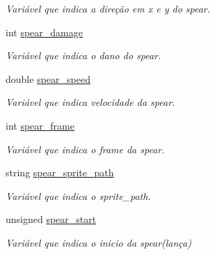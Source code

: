 \begin{DoxyCompactItemize}
\begin{DoxyCompactList}\small\item\em Variável que indica a direção em x e y do spear. \end{DoxyCompactList}\item 
\mbox{\label{classSpear_a11e9f24256eeaa389eaf8af20f70fbe8}} 
int \mbox{\hyperlink{classSpear_a11e9f24256eeaa389eaf8af20f70fbe8}{spear\+\_\+damage}}
\begin{DoxyCompactList}\small\item\em Variável que indica o dano do spear. \end{DoxyCompactList}\item 
\mbox{\label{classSpear_abe9b7dfdc8334550b3c9a77df43accc0}} 
double \mbox{\hyperlink{classSpear_abe9b7dfdc8334550b3c9a77df43accc0}{spear\+\_\+speed}}
\begin{DoxyCompactList}\small\item\em Variável que indica velocidade da spear. \end{DoxyCompactList}\item 
\mbox{\label{classSpear_a78be675fb88ce69127afc65682f7c8d5}} 
int \mbox{\hyperlink{classSpear_a78be675fb88ce69127afc65682f7c8d5}{spear\+\_\+frame}}
\begin{DoxyCompactList}\small\item\em Variável que indica o frame da spear. \end{DoxyCompactList}\item 
\mbox{\label{classSpear_a93eb583483f14338e8063baea9cdc7b1}} 
string \mbox{\hyperlink{classSpear_a93eb583483f14338e8063baea9cdc7b1}{spear\+\_\+sprite\+\_\+path}}
\begin{DoxyCompactList}\small\item\em Variável que indica o sprite\+\_\+path. \end{DoxyCompactList}\item 
\mbox{\label{classSpear_ab29788b30cc2545adad3cfad55c14307}} 
unsigned \mbox{\hyperlink{classSpear_ab29788b30cc2545adad3cfad55c14307}{spear\+\_\+start}}
\begin{DoxyCompactList}\small\item\em Variável que indica o inicio da spear(lança) \end{DoxyCompactList}\item 

\end{DoxyCompactItemize}
